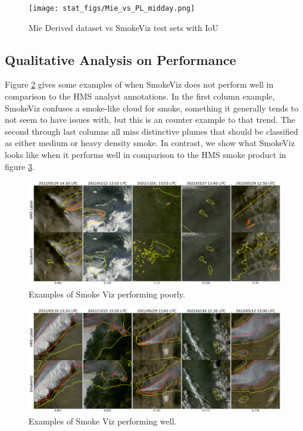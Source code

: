 \documentclass{article}
\begin{document}
\begin{figure}[!htb]
    \centering
    \texttt{[image: stat\_figs/Mie\_vs\_PL\_midday.png]}
    \caption{Mie Derived dataset vs SmokeViz test sets with IoU}
    \label{DM_vs_DP}
\end{figure}

\subsection{Qualitative Analysis on Performance}

Figure \ref{poor} gives some examples of when SmokeViz does not perform well in comparison to the HMS analyst annotations. In the first column example, SmokeViz confuses a smoke-like cloud for smoke, something it generally tends to not seem to have issues with, but this is an counter example to that trend. The second through last columns all miss distinctive plumes that should be classified as either medium or heavy density smoke. In contrast, we show what SmokeViz looks like when it performs well in comparison to the HMS smoke product in figure \ref{good}.

\begin{figure}[!htb]
    \centering
    \includegraphics[width=\linewidth]{stat_figs/bad_results.png}
    \caption{Examples of Smoke Viz performing poorly.}
    \label{poor}
\end{figure}


\begin{figure}[!htb]
    \centering
    \includegraphics[width=\linewidth]{stat_figs/good_results.png}
    \caption{Examples of Smoke Viz performing well.}
    \label{good}
\end{figure}
\end{document}
